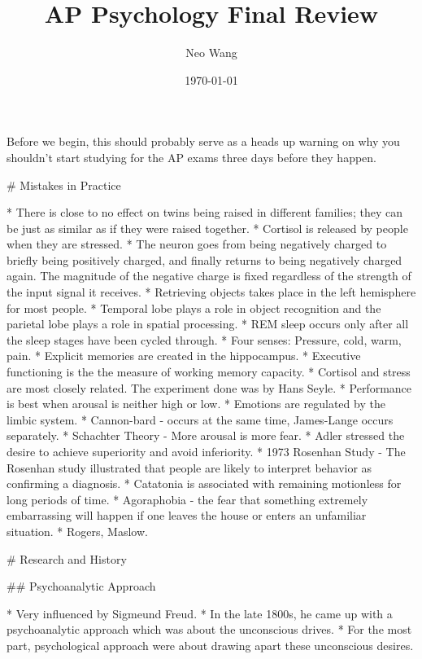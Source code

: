 \documentclass{article}
\title{AP Psychology Final Review}
\author{Neo Wang}
\date{\today}
\begin{document}
\maketitle

Before we begin, this should probably serve as a heads up warning on why you shouldn't start studying for the AP exams three days before they happen.

\tableofcontents

\begin{markdown}

# Mistakes in Practice

* There is close to no effect on twins being raised in different families; they can be just as similar as if they were raised together.
* Cortisol is released by people when they are stressed.
* The neuron goes from being negatively charged to briefly being positively charged, and finally returns to being negatively charged again. The magnitude of the negative charge is fixed regardless of the strength of the input signal it receives.
* Retrieving objects takes place in the left hemisphere for most people.
* Temporal lobe plays a role in object recognition and the parietal lobe plays a role in spatial processing.
* REM sleep occurs only after all the sleep stages have been cycled through.
* Four senses: Pressure, cold, warm, pain.
* Explicit memories are created in the hippocampus.
* Executive functioning is the the measure of working memory capacity.
* Cortisol and stress are most closely related. The experiment done was by Hans Seyle.
* Performance is best when arousal is neither high or low.
* Emotions are regulated by the limbic system.
* Cannon-bard - occurs at the same time, James-Lange occurs separately.
* Schachter Theory - More arousal is more fear.
* Adler stressed the desire to achieve superiority and avoid inferiority.
* 1973 Rosenhan Study - The Rosenhan study illustrated that people are likely to interpret behavior as confirming a diagnosis.
* Catatonia is associated with remaining motionless for long periods of time.
* Agoraphobia - the fear that something extremely embarrassing will happen if one leaves the house or enters an unfamiliar situation.
* Rogers, Maslow.

# Research and History

## Psychoanalytic Approach

* Very influenced by Sigmeund Freud.
* In the late 1800s, he came up with a psychoanalytic approach which was about the unconscious drives.
* For the most part, psychological approach were about drawing apart these unconscious desires.


\end{markdown}
\end{document}
